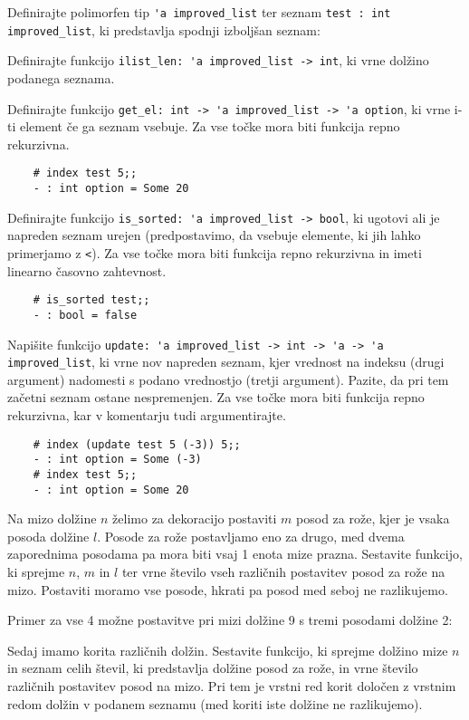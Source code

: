\documentclass[arhiv]{../izpit}
\begin{document}
	\podnaloga Definirajte polimorfen tip \verb|'a improved_list| ter seznam \verb|test : int improved_list|, ki predstavlja spodnji izboljšan seznam:
	
	
	\podnaloga Definirajte funkcijo \verb|ilist_len: 'a improved_list -> int|, ki vrne dolžino podanega seznama.
		
	\podnaloga Definirajte funkcijo \verb|get_el: int -> 'a improved_list -> 'a option|, ki vrne i-ti element če ga seznam vsebuje. Za vse točke mora biti funkcija repno rekurzivna.
	\begin{verbatim}
	# index test 5;;
	- : int option = Some 20
	\end{verbatim}
	
	\podnaloga Definirajte funkcijo \verb|is_sorted: 'a improved_list -> bool|, ki ugotovi ali je napreden seznam urejen (predpostavimo, da vsebuje elemente, ki jih lahko primerjamo z \verb|<|). Za vse točke mora biti funkcija repno rekurzivna in imeti linearno časovno zahtevnost.
	\begin{verbatim}
	# is_sorted test;;
	- : bool = false
	\end{verbatim}
	
	\podnaloga Napišite funkcijo \verb|update: 'a improved_list -> int -> 'a -> 'a improved_list|, ki vrne nov napreden seznam, kjer vrednost na indeksu (drugi argument) nadomesti s podano vrednostjo (tretji argument). Pazite, da pri tem začetni seznam ostane nespremenjen. Za vse točke mora biti funkcija repno rekurzivna, kar v komentarju tudi argumentirajte.
	\begin{verbatim}
	# index (update test 5 (-3)) 5;;
	- : int option = Some (-3)
	# index test 5;;
	- : int option = Some 20
	\end{verbatim}
	
  \naloga
  
  \podnaloga Na mizo dolžine $n$ želimo za dekoracijo postaviti $m$ posod za rože, kjer je vsaka posoda dolžine $l$. Posode za rože postavljamo eno za drugo, med dvema zaporednima posodama pa mora biti vsaj 1 enota mize prazna. Sestavite funkcijo, ki sprejme $n$, $m$ in $l$ ter vrne število vseh različnih postavitev posod za rože na mizo. Postaviti moramo vse posode, hkrati pa posod med seboj ne razlikujemo.

  Primer za vse 4 možne postavitve pri mizi dolžine 9 s tremi posodami dolžine 2:
  
	
  \podnaloga Sedaj imamo korita različnih dolžin. Sestavite funkcijo, ki sprejme dolžino mize $n$ in seznam celih števil, ki predstavlja dolžine posod za rože, in vrne število različnih postavitev posod na mizo. Pri tem je vrstni red korit določen z vrstnim redom dolžin v podanem seznamu (med koriti iste dolžine ne razlikujemo). 
	
\end{document}
